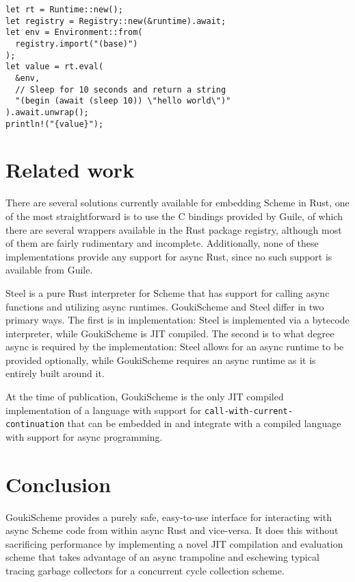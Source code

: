 \documentclass[sigplan]{acmart}
\begin{document}
\begin{verbatim}
let rt = Runtime::new();
let registry = Registry::new(&runtime).await;
let env = Environment::from(
  registry.import("(base)")
);
let value = rt.eval(
  &env,
  // Sleep for 10 seconds and return a string
  "(begin (await (sleep 10)) \"hello world\")"
).await.unwrap();
println!("{value}");
\end{verbatim}

\section{Related work}

There are several solutions currently available for embedding Scheme in Rust,
one of the most straightforward is to use the C bindings provided by Guile, of
which there are several wrappers available in the Rust package registry,
although most of them are fairly rudimentary and incomplete. Additionally, none
of these implementations provide any support for async Rust, since no such
support is available from Guile.

Steel \cite{steel} is a pure Rust interpreter for Scheme that has support for
calling async functions and utilizing async runtimes. GoukiScheme and Steel differ in
two primary ways. The first is in implementation: Steel is implemented via a
bytecode interpreter, while GoukiScheme is JIT compiled. The second is to what degree
async is required by the implementation: Steel allows for an async runtime to
be provided optionally, while GoukiScheme requires an async runtime as it is entirely
built around it.

At the time of publication, GoukiScheme is the only JIT compiled implementation
of a language with support for \texttt{call-with-current-continuation} that can
be embedded in and integrate with a compiled language with support for async
programming.

\section{Conclusion}

GoukiScheme provides a purely safe, easy-to-use interface for interacting with
async Scheme code from within async Rust and vice-versa. It does this without
sacrificing performance by implementing a novel JIT compilation and evaluation
scheme that takes advantage of an async trampoline and eschewing typical tracing
garbage collectors for a concurrent cycle collection scheme. 



\end{document}
